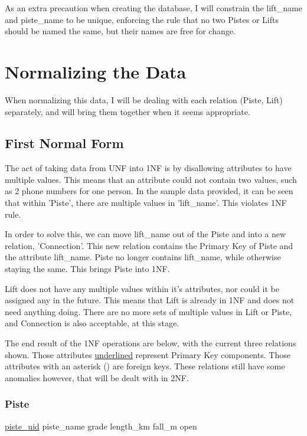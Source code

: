 \documentclass[11pt]{scrartcl} %
\begin{document}
As an extra precaution when creating the database, I will constrain the lift\_name and piste\_name to be unique, enforcing the rule that no two Pistes or Lifts should be named the same, but their names are free for change.

\newpage

\section{Normalizing the Data}
When normalizing this data, I will be dealing with each relation (Piste, Lift) separately, and will bring them together when it seems appropriate.
\subsection{First Normal Form}
The act of taking data from UNF into 1NF is by disallowing attributes to have multiple values. This means that an attribute could not contain two values, such as 2 phone numbers for one person. In the sample data provided, it can be seen that within 'Piste', there are multiple values in 'lift\_name'. This violates 1NF rule.

In order to solve this, we can move lift\_name out of the Piste and into a new relation, 'Connection'. This new relation contains the Primary Key of Piste and the attribute lift\_name. Piste no longer contains lift\_name, while otherwise staying the same. This brings Piste into 1NF.

Lift does not have any multiple values within it's attributes, nor could it be assigned any in the future. This means that Lift is already in 1NF and does not need anything doing. There are no more sets of multiple values in Lift or Piste, and Connection is also acceptable, at this stage.

The end result of the 1NF operations are below, with the current three relations shown. Those attributes \underline{underlined} represent Primary Key components. Those attributes with an asterisk (\*) are foreign keys. These relations still have some anomalies however, that will be dealt with in 2NF.

\subsubsection{Piste}
\underline{piste\_uid}\newline
piste\_name\newline
grade\newline
length\_km\newline
fall\_m\newline
open
\end{document}
